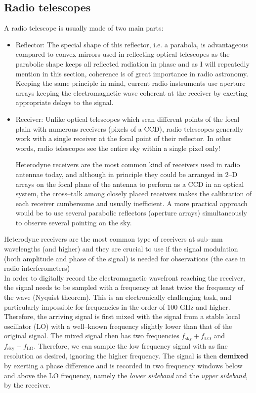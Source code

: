 \documentclass[paper=a4, fontsize=11pt]{scrartcl} %
\numberwithin{equation}{section} %
\numberwithin{figure}{section} %
\numberwithin{table}{section} %
\begin{document}
\subsection{Radio telescopes}
A radio telescope is usually made of two main parts:
\begin{itemize}
\item Reflector: The special shape of this reflector, i.e. a parabola, is advantageous compared to convex mirrors used in reflecting optical telescopes as the parabolic shape keeps all reflected radiation  in phase and as I will repeatedly mention in this section, coherence is of great importance in radio astronomy. Keeping the same principle in mind, current radio instruments use aperture arrays keeping the electromagnetic wave coherent at the receiver by exerting appropriate delays to the signal.
\item Receiver: Unlike optical telescopes which scan different points of the focal plain with numerous receivers (pixels of a CCD), radio telescopes generally work with a single receiver at the focal point of their reflector. In other words, radio telescopes see the entire sky within a single pixel only!

Heterodyne receivers are the most common kind of receivers used in radio antennae today, and although in principle they could be arranged in 2--D arrays on the focal plane of the antenna to perform as a CCD in an optical system, the cross--talk among closely placed receivers makes the calibration of each receiver cumbersome and usually inefficient. A more practical approach would be to use several parabolic reflectors (aperture arrays) simultaneously to observe several pointing on the sky.
\end{itemize}
Heterodyne receivers are the most common type of receivers at sub--mm wavelengths (and higher) and they are crucial to use if the signal modulation (both amplitude and phase of the signal) is needed for observations (the case in radio interferometers)\\

In order to digitally record the electromagnetic wavefront reaching the receiver, the signal needs to be sampled with a frequency at least twice the frequency of the wave (Nyquist theorem). This is an electronically challenging task, and particularly impossible for frequencies in the order of 100 GHz and higher. Therefore, the arriving signal is first mixed with the signal from a stable local oscillator (LO) with a well--known frequency slightly lower than that of the original signal. The mixed signal then has two frequencies $f_\mathrm{sky} + f_\mathrm{LO}$ and $f_\mathrm{sky} - f_\mathrm{LO}$. Therefore, we can sample the low frequency signal with as fine resolution as desired, ignoring the higher frequency. The signal is then {\bf demixed} by exerting a phase difference and is recorded in two frequency windows below and above the LO frequency, namely the \emph{lower sideband} and the \emph{upper sideband}, by the receiver.
\end{document}
